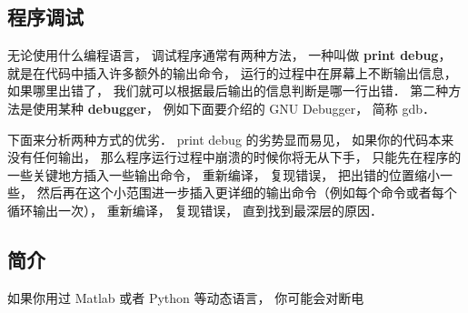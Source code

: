 
\subsection{程序调试}
无论使用什么编程语言， 调试程序通常有两种方法， 一种叫做 \textbf{print debug}， 就是在代码中插入许多额外的输出命令， 运行的过程中在屏幕上不断输出信息， 如果哪里出错了， 我们就可以根据最后输出的信息判断是哪一行出错． 第二种方法是使用某种 \textbf{debugger}， 例如下面要介绍的 GNU Debugger， 简称 gdb．

下面来分析两种方式的优劣． print debug 的劣势显而易见， 如果你的代码本来没有任何输出， 那么程序运行过程中崩溃的时候你将无从下手， 只能先在程序的一些关键地方插入一些输出命令， 重新编译， 复现错误， 把出错的位置缩小一些， 然后再在这个小范围进一步插入更详细的输出命令（例如每个命令或者每个循环输出一次）， 重新编译， 复现错误， 直到找到最深层的原因． 

\subsection{简介}
如果你用过 Matlab 或者 Python 等动态语言， 你可能会对断电
